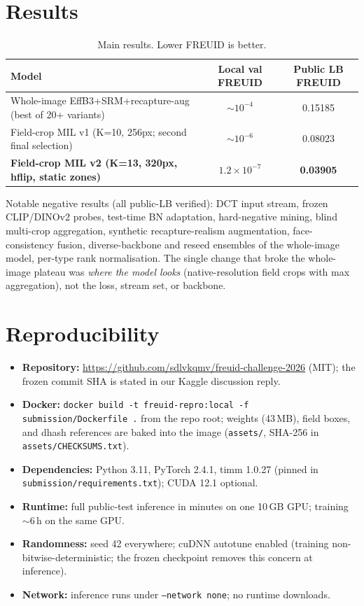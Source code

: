 \documentclass[11pt,a4paper]{article}
\begin{document}
\section{Results}
\label{sec:results}

\begin{table}[h]
  \centering
  \caption{Main results. Lower FREUID is better.}
  \label{tab:results}
  \begin{tabular}{lcc}
    \toprule
    Model & Local val FREUID & Public LB FREUID \\
    \midrule
    Whole-image EffB3+SRM+recapture-aug (best of 20+ variants) & $\sim10^{-4}$ & 0.15185 \\
    Field-crop MIL v1 (K=10, 256px; second final selection) & $\sim10^{-6}$ & 0.08023 \\
    \textbf{Field-crop MIL v2 (K=13, 320px, hflip, static zones)} & $1.2\times10^{-7}$ & \textbf{0.03905} \\
    \bottomrule
  \end{tabular}
\end{table}

Notable negative results (all public-LB verified): DCT input stream, frozen
CLIP/DINOv2 probes, test-time BN adaptation, hard-negative mining, blind
multi-crop aggregation, synthetic recapture-realism augmentation,
face-consistency fusion, diverse-backbone and reseed ensembles of the
whole-image model, per-type rank normalisation. The single change that broke
the whole-image plateau was \emph{where the model looks} (native-resolution
field crops with max aggregation), not the loss, stream set, or backbone.

\section{Reproducibility}
\label{sec:repro}
\begin{itemize}[noitemsep]
  \item \textbf{Repository:} \url{https://github.com/sdlvkqmv/freuid-challenge-2026} (MIT); the frozen commit SHA is stated in our Kaggle discussion reply.
  \item \textbf{Docker:} \texttt{docker build -t freuid-repro:local -f submission/Dockerfile .} from the repo root; weights (43\,MB), field boxes, and dhash references are baked into the image (\texttt{assets/}, SHA-256 in \texttt{assets/CHECKSUMS.txt}).
  \item \textbf{Dependencies:} Python 3.11, PyTorch 2.4.1, timm 1.0.27 (pinned in \texttt{submission/requirements.txt}); CUDA 12.1 optional.
  \item \textbf{Runtime:} full public-test inference in minutes on one 10\,GB GPU; training $\sim$6\,h on the same GPU.
  \item \textbf{Randomness:} seed 42 everywhere; cuDNN autotune enabled (training non-bitwise-deterministic; the frozen checkpoint removes this concern at inference).
  \item \textbf{Network:} inference runs under \texttt{--network none}; no runtime downloads.
\end{itemize}
\end{document}
